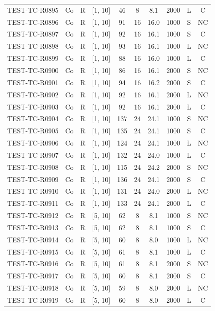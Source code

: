 \begin{longtable}{lccccccccc}
TEST-TC-R0895 & Co & R & [1, 10] & 46 & 8 & 8.1 & 2000 & L & C \\
TEST-TC-R0896 & Co & R & [1, 10] & 91 & 16 & 16.0 & 1000 & S & NC \\
TEST-TC-R0897 & Co & R & [1, 10] & 92 & 16 & 16.1 & 1000 & S & C \\
TEST-TC-R0898 & Co & R & [1, 10] & 93 & 16 & 16.1 & 1000 & L & NC \\
TEST-TC-R0899 & Co & R & [1, 10] & 88 & 16 & 16.0 & 1000 & L & C \\
TEST-TC-R0900 & Co & R & [1, 10] & 86 & 16 & 16.1 & 2000 & S & NC \\
TEST-TC-R0901 & Co & R & [1, 10] & 94 & 16 & 16.2 & 2000 & S & C \\
TEST-TC-R0902 & Co & R & [1, 10] & 92 & 16 & 16.1 & 2000 & L & NC \\
TEST-TC-R0903 & Co & R & [1, 10] & 92 & 16 & 16.1 & 2000 & L & C \\
TEST-TC-R0904 & Co & R & [1, 10] & 137 & 24 & 24.1 & 1000 & S & NC \\
TEST-TC-R0905 & Co & R & [1, 10] & 135 & 24 & 24.1 & 1000 & S & C \\
TEST-TC-R0906 & Co & R & [1, 10] & 124 & 24 & 24.1 & 1000 & L & NC \\
TEST-TC-R0907 & Co & R & [1, 10] & 132 & 24 & 24.0 & 1000 & L & C \\
TEST-TC-R0908 & Co & R & [1, 10] & 115 & 24 & 24.2 & 2000 & S & NC \\
TEST-TC-R0909 & Co & R & [1, 10] & 136 & 24 & 24.1 & 2000 & S & C \\
TEST-TC-R0910 & Co & R & [1, 10] & 131 & 24 & 24.0 & 2000 & L & NC \\
TEST-TC-R0911 & Co & R & [1, 10] & 133 & 24 & 24.1 & 2000 & L & C \\
TEST-TC-R0912 & Co & R & [5, 10] & 62 & 8 & 8.1 & 1000 & S & NC \\
TEST-TC-R0913 & Co & R & [5, 10] & 62 & 8 & 8.1 & 1000 & S & C \\
TEST-TC-R0914 & Co & R & [5, 10] & 60 & 8 & 8.0 & 1000 & L & NC \\
TEST-TC-R0915 & Co & R & [5, 10] & 61 & 8 & 8.1 & 1000 & L & C \\
TEST-TC-R0916 & Co & R & [5, 10] & 61 & 8 & 8.1 & 2000 & S & NC \\
TEST-TC-R0917 & Co & R & [5, 10] & 60 & 8 & 8.1 & 2000 & S & C \\
TEST-TC-R0918 & Co & R & [5, 10] & 59 & 8 & 8.0 & 2000 & L & NC \\
TEST-TC-R0919 & Co & R & [5, 10] & 60 & 8 & 8.0 & 2000 & L & C \\

\end{longtable}
